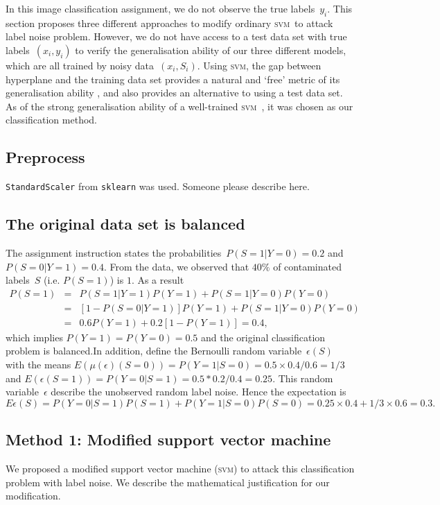 \documentclass{article} %
\newcommand{\svm}{\textsc{svm}}
\begin{document}
In this image classification assignment, we do not observe the true labels~$y_i$. This section proposes three different approaches to modify ordinary \svm\ to attack label noise problem. However, we do not have access to a test data set with true labels~$(x_i,y_i)$ to verify the generalisation ability of our three different models, which are all trained by noisy data~$(x_i,S_i)$. Using \svm , the gap between hyperplane and the training data set provides a natural and `free' metric of its generalisation ability  \citep{hastie01statisticallearning}, and also provides an alternative to using a test data set. As of the strong generalisation ability of a well-trained \svm\ \citep{Cortes1995,NIPS2012_4500}, it was chosen as our classification method.
\subsection{Preprocess}
\texttt{StandardScaler} from \texttt{sklearn} was used. Someone please describe here.

\subsection{The original data set is balanced} \label{sec:1}
The assignment instruction states the probabilities~$P(S=1|Y=0)=0.2$ and $P(S=0|Y=1)=0.4$. From the data, we observed that $40\%$ of contaminated labels~$S$ (i.e. $P(S=1)$) is $1$. As a result
\begin{eqnarray*}
P(S=1)&=&P(S=1|Y=1)P(Y=1)+P(S=1|Y=0)P(Y=0)\\
     &=&\left[1-P(S=0|Y=1)\right]P(Y=1)+P(S=1|Y=0)P(Y=0)\\
     &=&0.6P(Y=1)+0.2\left[1-P(Y=1)\right]=0.4, \nonumber
\end{eqnarray*}
which implies $P(Y=1)=P(Y=0)=0.5$ and the original classification problem is balanced.In addition, define the Bernoulli random variable~$\epsilon(S)$ with the means $E(\mu(\epsilon)(S=0))=P(Y=1|S=0)=0.5\times0.4/0.6=1/3$ and $E(\epsilon(S=1))=P(Y=0|S=1)=0.5*0.2/0.4=0.25$. This random variable~$\epsilon$ describe the unobserved random label noise. Hence the expectation is
\begin{equation}
    E\epsilon(S)=P(Y=0|S=1)P(S=1)+P(Y=1|S=0)P(S=0)=0.25\times 0.4+1/3\times0.6=0.3.\label{eq:exp}
\end{equation}
\subsection{Method 1: Modified support vector machine}
We proposed a modified support vector machine (\textsc{svm}) to attack this classification problem with label noise. We describe the mathematical justification for our modification.
\end{document}

